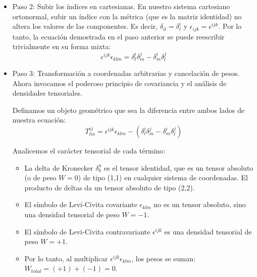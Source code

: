 \documentclass[11pt,spanish]{article}
\begin{document}
\begin{itemize}
\begin{itemize}
\begin{itemize}
\hspace{1cm} LHS = $(1)(1) = 1$.
        
\hspace{1cm} RHS = $\delta_{11}\delta_{22} - \delta_{12}\delta_{21} = (1)(1) - (0)(0) = 1$. 

¡Coincide!

\item Subcaso B2 ($i=m=1, j=l=2$):

\hspace{1cm} LHS = $\epsilon_{123}\epsilon_{321}$. 

Como $\epsilon_{321} = -1$, LHS = $(1)(-1) = -1$.

\hspace{1cm} RHS = $\delta_{12}\delta_{21} - \delta_{11}\delta_{22} = (0)(0) - (1)(1) = -1$. 

¡Coincide!
\end{itemize}
\end{itemize}

Como comprobamos todos los casos independientes aprovechando las simetrías, la identidad queda demostrada en coordenadas cartesianas.

\item Paso 2: Subir los índices en cartesianas.
En nuestro sistema cartesiano ortonormal, subir un índice con la métrica (que es la matriz identidad) no altera los valores de las componentes. Es decir, $\delta_{il} = \delta^i_l$ y $\epsilon_{ijk} = \epsilon^{ijk}$. 
Por lo tanto, la ecuación demostrada en el paso anterior se puede reescribir trivialmente en su forma mixta:
$$
\epsilon^{ijk}\epsilon_{klm} = \delta^i_l\delta^j_m - \delta^i_m\delta^j_l
$$

\item Paso 3: Transformación a coordenadas arbitrarias y cancelación de pesos.
Ahora invocamos el poderoso principio de covariancia y el análisis de densidades tensoriales. 

Definamos un objeto geométrico que sea la diferencia entre ambos lados de nuestra ecuación:
$$T^{ij}_{lm} = \epsilon^{ijk}\epsilon_{klm} - (\delta^i_l\delta^j_m - \delta^i_m\delta^j_l)$$

Analicemos el carácter tensorial de cada término:
\begin{itemize}
\item La delta de Kronecker $\delta^a_b$ es el tensor identidad, que es un tensor absoluto (o de peso $W=0$) de tipo (1,1) en cualquier sistema de coordenadas. El producto de deltas da un tensor absoluto de tipo (2,2).
\item El símbolo de Levi-Civita covariante $\epsilon_{klm}$ no es un tensor absoluto, sino una densidad tensorial de peso $W = -1$.
\item El símbolo de Levi-Civita contravariante $\epsilon^{ijk}$ es una densidad tensorial de peso $W = +1$.
\item Por lo tanto, al multiplicar $\epsilon^{ijk}\epsilon_{klm}$, los pesos se suman: $W_{total} = (+1) + (-1) = 0$. 
\end{itemize}


\end{itemize}
\end{document}
